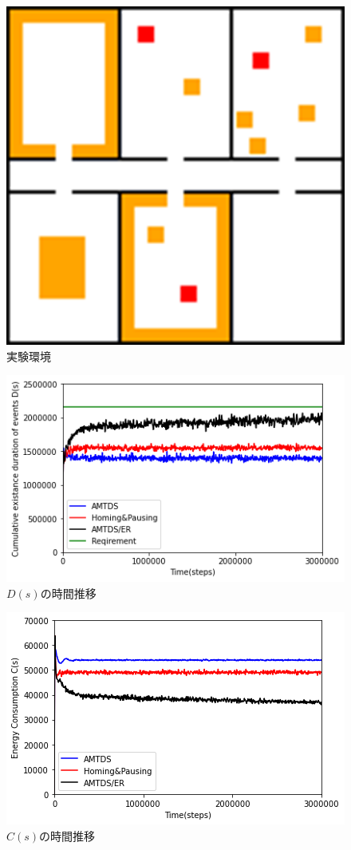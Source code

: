 \documentclass[11pt,a4j,twocolumn]{jarticle}
\begin{document}
\begin{figure}
  \centering
  \includegraphics[width=0.5\hsize]{figures/Graph_Office.png}
  \caption{実験環境}
  \label{fig:env}
\end{figure}

\begin{figure}
  \centering
  \includegraphics[width=0.8\hsize]{figures/ds_graph_3600_ave_ER_Office_600.png}
  \caption{$D(s)$の時間推移}
  \label{fig:ds_ER_Office}
\end{figure}

\begin{figure}
  \centering
  \includegraphics[width=0.8\hsize]{figures/cs_graph_3600_ave_ER_Office_600.png}
  \caption{$C(s)$の時間推移}
  \label{fig:cs_ER_Office}
\end{figure}
\end{document}
